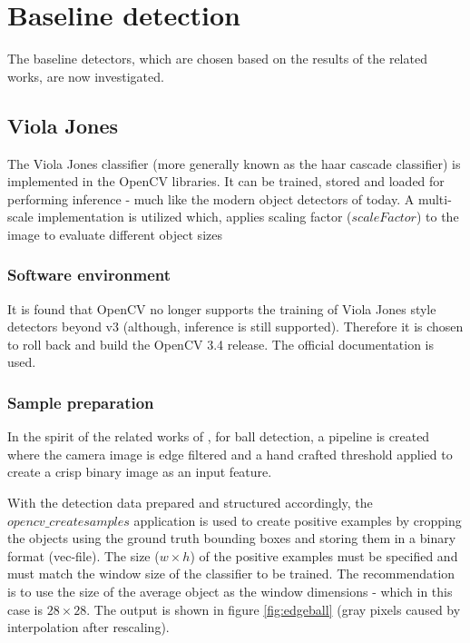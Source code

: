 \documentclass[a4paper,twoside,12pt]{report}
\begin{document}
\section{Baseline detection}

The baseline detectors, which are chosen based on the results of the related works, are now investigated.

\subsection{Viola Jones}

The Viola Jones classifier (more generally known as the haar cascade classifier) is implemented in the OpenCV libraries. It can be trained, stored and loaded for performing inference - much like the modern object detectors of today. A multi-scale implementation is utilized which, applies scaling factor ($scaleFactor$) to the image to evaluate different object sizes  

\subsubsection{Software environment}

It is found that OpenCV no longer supports the training of Viola Jones style detectors beyond v3 (although, inference is still supported). Therefore it is chosen to roll back and build the OpenCV 3.4 release. The official documentation \cite{vjdataset} is used.

\subsubsection{Sample preparation}

In the spirit of the related works of \cite{robovj}, for ball detection, a pipeline is created where the camera image is edge filtered and a hand crafted threshold applied to create a crisp binary image as an input feature. 

With the detection data prepared and structured accordingly, the $opencv\_createsamples$ application is used to create positive examples by cropping the objects using the ground truth bounding boxes and storing them in a binary format (vec-file). The size ($w\times h$) of the positive examples must be specified and must match the window size of the classifier to be trained. The \cite{vjdataset} recommendation is to use the size of the average object as the window dimensions - which in this case is $28\times 28$. The output is shown in figure \ref{fig:edgeball} (gray pixels caused by interpolation after rescaling).
\end{document}

